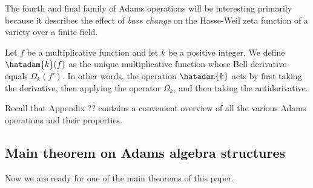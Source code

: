 \documentclass[a4paper]{article}
\begin{document}
The fourth and final family of Adams operations will be interesting primarily because it describes the effect of \emph{base change} on the Hasse-Weil zeta function of a variety over a finite field.

\begin{definition}
Let $f$ be a multiplicative function and let $k$ be a positive integer. We define $\hatadam{k}(f)$ as the unique multiplicative function whose Bell derivative equals $\Omega_k(f')$. In other words, the operation $\hatadam{k}$ acts by first taking the derivative, then applying the operator $\Omega_k$, and then taking the antiderivative.

\end{definition}

Recall that Appendix ?? contains a convenient overview of all the various Adams operations and their properties.


\subsection{Main theorem on Adams algebra structures}

Now we are ready for one of the main theorems of this paper.
\end{document}
